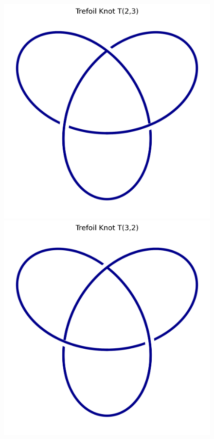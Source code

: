 \begin{figure}[H]
\centering
\begin{minipage}{0.45\textwidth}
    \centering
    \includegraphics[width=\linewidth]{images/trefoil_knot_2.3}
\end{minipage}
\hfill
\begin{minipage}{0.45\textwidth}
    \centering
    \includegraphics[width=\linewidth]{images/trefoil_knot_3.2}

\end{minipage}
\end{figure}
